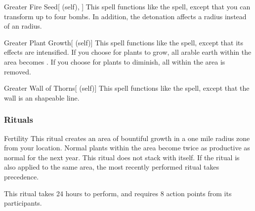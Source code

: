\lowercase{\hypertarget{spell:Greater Fire Seed}{}}\label{spell:Greater Fire Seed}
\begin{attuneability}[\nth{4}]{\hypertarget{spell:Greater Fire Seed}{Greater Fire Seed}}[ (self), ]
This spell functions like the  spell, except that you can transform up to four bombs.
In addition, the detonation affects a \areamed radius instead of an \areasmall radius.
\end{attuneability}
\vspace{0.25em}



\lowercase{\hypertarget{spell:Greater Plant Growth}{}}\label{spell:Greater Plant Growth}
\begin{attuneability}[\nth{4}]{\hypertarget{spell:Greater Plant Growth}{Greater Plant Growth}}[ (self)]
This spell functions like the  spell, except that its effects are intensified.
If you choose for plants to grow, all arable earth within the area becomes .
If you choose for plants to diminish, all  within the area is removed.
\end{attuneability}
\vspace{0.25em}



\lowercase{\hypertarget{spell:Greater Wall of Thorns}{}}\label{spell:Greater Wall of Thorns}
\begin{attuneability}[\nth{4}]{\hypertarget{spell:Greater Wall of Thorns}{Greater Wall of Thorns}}[ (self)]
This spell functions like the  spell, except that the wall is an \arealarge shapeable line.
\end{attuneability}
\vspace{0.25em}



\subsubsection{Rituals}


\lowercase{\hypertarget{spell:Fertility}{}}\label{spell:Fertility}
\begin{apability}[\nth{2}]{\hypertarget{spell:Fertility}{Fertility}}
This ritual creates an area of bountiful growth in a one mile radius zone from your location.
Normal plants within the area become twice as productive as normal for the next year.
This ritual does not stack with itself.
If the  ritual is also applied to the same area, the most recently performed ritual takes precedence.

This ritual takes 24 hours to perform, and requires 8 action points from its participants.
\end{apability}
\vspace{0.25em}



